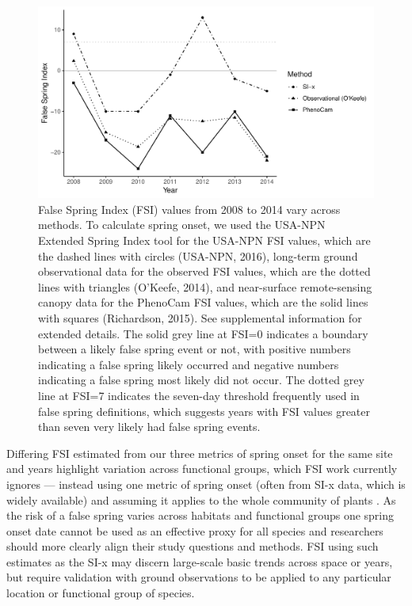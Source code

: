 \documentclass{article}\usepackage[]{graphicx}\usepackage[]{color}
\makeatletter
\def\maxwidth{ %
  \ifdim\Gin@nat@width>\linewidth
    \linewidth
  \else
    \Gin@nat@width
  \fi
}
\makeatother
\begin{document}
\begin{figure}[H]

{\centering \includegraphics[width=\maxwidth]{figure/fsifig-1} 

}

\caption[False Spring Index (FSI) values from 2008 to 2014 vary across methods]{False Spring Index (FSI) values from 2008 to 2014 vary across methods. To calculate spring onset, we used the USA-NPN Extended Spring Index tool for the USA-NPN FSI values, which are the dashed lines with circles (USA-NPN, 2016), long-term ground observational data for the observed FSI values, which are the dotted lines with triangles (O'Keefe, 2014), and near-surface remote-sensing canopy data for the PhenoCam FSI values, which are the solid lines with squares (Richardson, 2015). See supplemental information for extended details. The solid grey line at FSI=0 indicates a boundary between a likely false spring event or not, with positive numbers indicating a false spring likely occurred and negative numbers indicating a false spring most likely did not occur. The dotted grey line at FSI=7 indicates the seven-day threshold frequently used in false spring definitions, which suggests years with FSI values greater than seven very likely had false spring events.}\label{fig:fsifig}
\end{figure}



Differing FSI estimated from our three metrics of spring onset for the same site and years highlight variation across functional groups, which FSI work currently ignores --- instead using one metric of spring onset (often from SI-x data, which is widely available) and assuming it applies to the whole community of plants \citep{Allstadt2015, Marino2011, Mehdipoor2017, Peterson2014}. As the risk of a false spring varies across habitats and functional groups \citep{Martin2010} one spring onset date cannot be used as an effective proxy for all species and researchers should more clearly align their study questions and methods. FSI using such estimates as the SI-x may discern large-scale basic trends across space or years, but require validation with ground observations to be applied to any particular location or functional group of species. 
\end{document}
